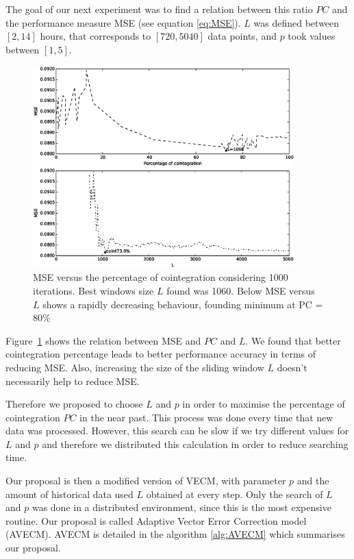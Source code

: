 The goal of our next experiment was to find a relation between this ratio $PC$
and the performance measure MSE (see equation \ref{eq:MSE}). $L$ was defined
between $[2,14]$ hours, that corresponds to $[720, 5040]$ data points, and $p$
took values between $[1,5]$.  

\begin{figure}[ht!]
  \centering
   \includegraphics[width=0.9\textwidth]{img/Fig2}
  \caption{MSE versus the percentage of cointegration considering 1000
  iterations. Best windows size $L$ found was 1060. Below MSE versus $L$ shows a
  rapidly decreasing behaviour, founding minimum at PC = 80\% }
  \label{fig:cointvsmse}
\end{figure}

Figure~\ref{fig:cointvsmse} shows the relation between MSE and $PC$ and $L$.  We
found that better cointegration percentage leads to better performance accuracy
in terms of reducing MSE. Also, increasing the size of the sliding window $L$
doesn't necessarily help to reduce MSE.

Therefore we proposed to choose $L$ and $p$ in order to maximise the percentage
of cointegration $PC$ in the near past. This process was done every time that
new data was processed. However, this search can be slow if we try different
values for $L$ and $p$ and therefore we distributed this calculation in order to
reduce searching time.

Our proposal is then a modified version of VECM, with parameter $p$ and the
amount of historical data used $L$ obtained at every step. Only the search of
$L$ and $p$ was done in a distributed environment, since this is the most
expensive routine. Our proposal is called Adaptive Vector Error Correction model
(AVECM). AVECM is detailed in the algorithm \ref{alg:AVECM} which summarises
our proposal.

